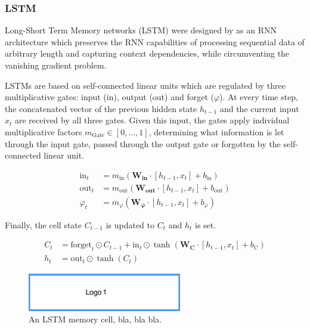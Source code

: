 \subsubsection{LSTM}\label{LSTM}

Long-Short Term Memory networks (LSTM) were designed by \cite{Hochreiter1997} as an RNN architecture which preserves the RNN capabilities of processing sequential data of arbitrary length and capturing context dependencies, while circumventing the vanishing gradient problem.

LSTMs are based on self-connected linear units which are regulated by three multiplicative gates: input (in), output (out) and forget ($\varphi$). At every time step, the concatenated vector of the previous hidden state $h_{t-1}$ and the current input $x_{t}$ are received by all three gates. Given this input, the gates apply individual multiplicative factors $m_{\text{Gate}} \in [0, \dots, 1]$, determining what information is let through the input gate, passed through the output gate or forgotten by the self-connected linear unit.

\begin{align*}
\text{in}_{t} &= m_{\text{in}} (\boldsymbol{W_{\text{in}}} \cdot [h_{t-1},x_{t}] + b_{\text{in}}) \\
\text{out}_{t} &= m_{\text{out}} (\boldsymbol{W_{\text{out}}} \cdot [h_{t-1},x_{t}] + b_{\text{out}}) \\
\varphi_{t} &= m_{\varphi} (\boldsymbol{W_{\varphi}} \cdot [h_{t-1},x_{t}] + b_{\varphi})
\end{align*}

Finally, the cell state $C_{t-1}$ is updated to $C_{t}$ and $h_{t}$ is set.

\begin{align*}
C_{t} &= \text{forget}_{t} \odot C_{t-1} + \text{in}_{t} \odot \tanh (\boldsymbol{W_{C}} \cdot [h_{t-1},x_{t}] + b_{\text{C}}) \\
h_{t} &= \text{out}_{t} \odot \tanh (C_{t})
\end{align*}

\begin{figure}[htb]
 \centering
 \includegraphics[width=0.6\textwidth]{abb/logo1}
 \caption[LSTM Memory Cell]{An LSTM memory cell, bla, bla bla.}
\label{fig:memoryCellLSTM}
\end{figure}


